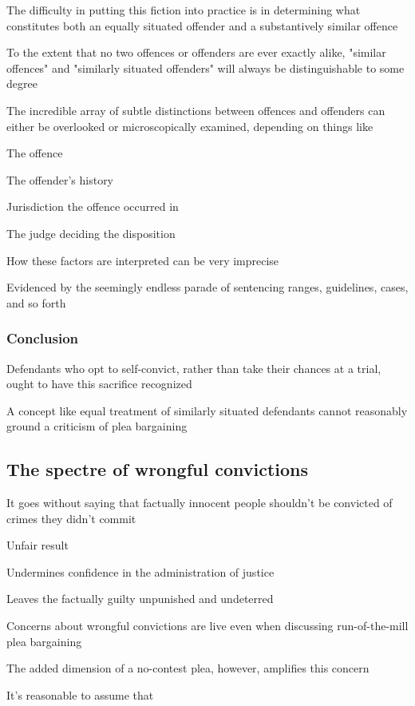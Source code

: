 The difficulty in putting this fiction into practice is in determining what constitutes both an equally situated offender and a substantively similar offence

To the extent that no two offences or offenders are ever exactly alike, "similar offences" and "similarly  situated offenders" will always be distinguishable to some degree

The incredible array of subtle distinctions between offences and offenders can either be overlooked or microscopically examined, depending on things like

The offence

The offender's history

Jurisdiction the offence occurred in

The judge deciding the disposition

How these factors are interpreted can be very imprecise

Evidenced by the seemingly endless parade of sentencing ranges, guidelines, cases, and so forth

\subsubsection{Conclusion}

Defendants who opt to self-convict, rather than take their chances at a trial, ought to have this sacrifice recognized

A concept like equal treatment of similarly situated defendants cannot reasonably ground a criticism of plea bargaining


\subsection{The spectre of wrongful convictions}

It goes without saying that factually innocent people shouldn't be convicted of crimes they didn't commit

Unfair result

Undermines confidence in the administration of justice

Leaves the factually guilty unpunished and undeterred

Concerns about wrongful convictions are live even when discussing run-of-the-mill plea bargaining

The added dimension of a no-contest plea, however, amplifies this concern

It's reasonable to assume that

